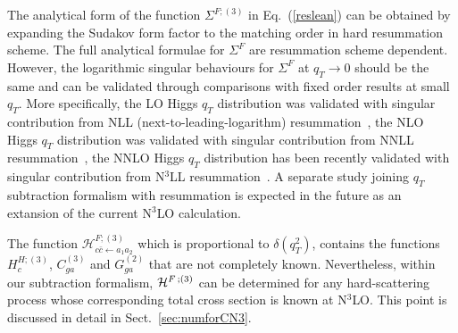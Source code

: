\documentclass[12pt]{article}
\begin{document}
The analytical form of the function $\Sigma^{F;(3)}$ in Eq.~(\ref{reslean}) can be obtained by expanding the Sudakov form factor to the matching order in hard resummation scheme. The full analytical formulae for $\Sigma^{F}$ are resummation scheme dependent. However, the logarithmic singular behaviours for $\Sigma^{F}$ at $q_T\rightarrow 0$ should be the same and can be validated through comparisons with fixed order results at small $q_T$. More specifically, the LO Higgs $q_T$ distribution was validated with singular contribution from NLL (next-to-leading-logarithm) resummation~\cite{Catani:1988vd,Kauffman:1991cx}, the NLO Higgs $q_T$ distribution was validated with singular contribution from NNLL resummation~\cite{deFlorian:2000pr,deFlorian:2001zd}, the NNLO Higgs $q_T$ distribution has been recently validated with singular contribution from N$^3$LL resummation~\cite{Chen:2018pzu,Bizon:2018foh}. A separate study joining $q_T$ subtraction formalism with resummation is expected in the future as an extansion of the current N$^3$LO calculation.

The function $\mathcal{H}^{F;(3)}_{c\bar{c}\leftarrow a_{1}a_{2}}$ which is proportional to $\delta(q^{2}_{T})$, contains the functions $H^{H;(3)}_{c}$, $C^{(3)}_{ga}$ and $G^{(2)}_{ga}$  that are not completely known. Nevertheless, within our subtraction  formalism, ${\cal H}^{F \,;(3)}$ can be determined for any hard-scattering process whose corresponding total cross section is known at N$^{3}$LO. This point is discussed in detail in Sect.~\ref{sec:numforCN3}. 


\setcounter{footnote}{0}
\end{document}
